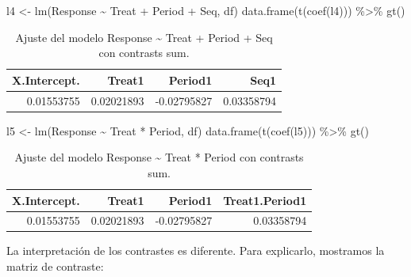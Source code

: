 \documentclass[
  12pt,
  a4paper,
  extrafontsizes,
  onecolumn,
  openright]{memoir}
\newenvironment{Shaded}{\begin{snugshade}}{\end{snugshade}}
\newcommand{\FunctionTok}[1]{\textcolor[rgb]{0.28,0.35,0.67}{#1}}
\newcommand{\NormalTok}[1]{\textcolor[rgb]{0.00,0.23,0.31}{#1}}
\newcommand{\OtherTok}[1]{\textcolor[rgb]{0.00,0.23,0.31}{#1}}
\newcommand{\SpecialCharTok}[1]{\textcolor[rgb]{0.37,0.37,0.37}{#1}}
\begin{document}
\scriptsize

\begin{Shaded}
\begin{Highlighting}[]
\NormalTok{l4 }\OtherTok{\textless{}{-}} \FunctionTok{lm}\NormalTok{(Response }\SpecialCharTok{\textasciitilde{}}\NormalTok{ Treat }\SpecialCharTok{+}\NormalTok{ Period }\SpecialCharTok{+}\NormalTok{ Seq, df)}
\FunctionTok{data.frame}\NormalTok{(}\FunctionTok{t}\NormalTok{(}\FunctionTok{coef}\NormalTok{(l4))) }\SpecialCharTok{\%\textgreater{}\%} \FunctionTok{gt}\NormalTok{()}
\end{Highlighting}
\end{Shaded}

\hypertarget{tbl-l4}{}
\begin{longtable}{rrrr}
\caption{\label{tbl-l4}Ajuste del modelo Response \textasciitilde{} Treat + Period + Seq con
contrasts sum. }\tabularnewline

\toprule
X.Intercept. & Treat1 & Period1 & Seq1 \\ 
\midrule
0.01553755 & 0.02021893 & -0.02795827 & 0.03358794 \\ 
\bottomrule
\end{longtable}

\normalsize

\scriptsize

\begin{Shaded}
\begin{Highlighting}[]
\NormalTok{l5 }\OtherTok{\textless{}{-}} \FunctionTok{lm}\NormalTok{(Response }\SpecialCharTok{\textasciitilde{}}\NormalTok{ Treat }\SpecialCharTok{*}\NormalTok{ Period, df)}
\FunctionTok{data.frame}\NormalTok{(}\FunctionTok{t}\NormalTok{(}\FunctionTok{coef}\NormalTok{(l5))) }\SpecialCharTok{\%\textgreater{}\%} \FunctionTok{gt}\NormalTok{()}
\end{Highlighting}
\end{Shaded}

\hypertarget{tbl-l5}{}
\begin{longtable}{rrrr}
\caption{\label{tbl-l5}Ajuste del modelo Response \textasciitilde{} Treat * Period con
contrasts sum. }\tabularnewline

\toprule
X.Intercept. & Treat1 & Period1 & Treat1.Period1 \\ 
\midrule
0.01553755 & 0.02021893 & -0.02795827 & 0.03358794 \\ 
\bottomrule
\end{longtable}

\normalsize

La interpretación de los contrastes es diferente. Para explicarlo,
mostramos la matriz de contraste:
\end{document}
